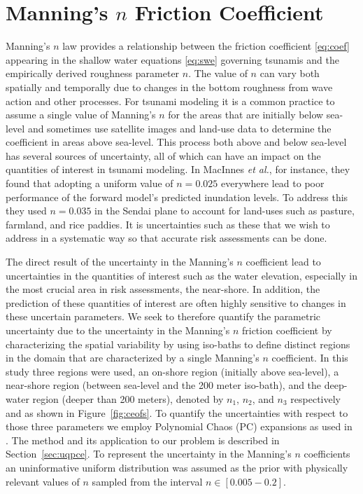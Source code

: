 \section{Manning’s $n$ Friction Coefficient} \label{sec:manning}

Manning's $n$ law provides a relationship between the friction coefficient
\eqref{eq:coef} appearing in the shallow water equations \eqref{eq:swe}
governing tsunamis and the empirically derived roughness parameter $n$.  The 
value of $n$ can vary both spatially and temporally due to changes in the
bottom roughness from wave action and other processes.  For tsunami modeling it
is a common practice to assume a single value of Manning's $n$ for the areas
that are initially below sea-level and sometimes use satellite images and 
land-use data to determine the coefficient in areas above sea-level.  This
process both above and below sea-level has several sources of uncertainty, all
of which can have an impact on the quantities of interest in tsunami modeling.   
In MacInnes \emph{et al.}, for
instance, they found that adopting a uniform value of $n = 0.025$ everywhere
lead to poor performance of the forward model's predicted inundation levels.  To
address this they used $n = 0.035$ in the Sendai plane to account for land-uses 
such as pasture, farmland, and rice paddies.  It is uncertainties such as these 
that we wish to address in a systematic way so that accurate risk assessments 
can be done.

The direct result of the uncertainty in the Manning's $n$ coefficient lead to
uncertainties in the quantities of interest such as the water elevation,
especially in the most crucial area in risk assessments, the near-shore. In 
addition,  the prediction of these quantities of interest are often highly 
sensitive to changes in these uncertain parameters.  We seek to therefore 
quantify the parametric uncertainty due to the uncertainty in the Manning's $n$ 
friction coefficient by characterizing the spatial variability by using
iso-baths to define distinct regions in the domain that are characterized by a
single Manning's $n$ coefficient.  In this study three regions were used, an
on-shore region (initially above sea-level), a near-shore region (between
sea-level and the 200 meter iso-bath), and the deep-water region (deeper than
200 meters), denoted by $n_1$, $n_2$, and $n_3$ respectively and as shown in 
Figure~\ref{fig:ceofs}. To quantify the uncertainties
with respect to those three parameters we employ Polynomial Chaos (PC) 
expansions as used in \cite{sraj:2013a,sraj:2013b}.  The method and its 
application to our problem is
described in Section~\ref{sec:uqpce}.  To represent the uncertainty in the
Manning's $n$ coefficients an uninformative uniform distribution was assumed as 
the prior with physically relevant values of $n$ sampled from the interval 
$n \in [0.005-0.2]$.

